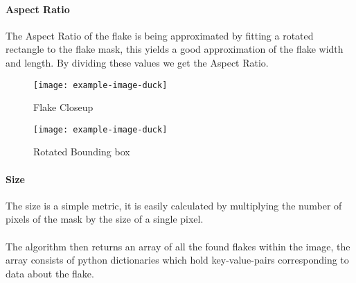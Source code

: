 \paragraph{Aspect Ratio}
The Aspect Ratio of the flake is being approximated by fitting a rotated rectangle to the flake mask, this yields a good approximation of the flake width and length. By dividing these values we get the Aspect Ratio.
\begin{figure}[h!]
\centering
\begin{minipage}{.45\textwidth}
  \centering
  \texttt{[image: example-image-duck]}
  \caption{Flake Closeup}
\end{minipage}
\begin{minipage}{.45\textwidth}

  \centering
  \texttt{[image: example-image-duck]}
    \caption{Rotated Bounding box}
\end{minipage}
\end{figure}

\paragraph{Size}
The size is a simple metric, it is easily calculated by multiplying the number of pixels of the mask by the size of a single pixel.\\
\\
The algorithm then returns an array of all the found flakes within the image, the array consists of python dictionaries which hold key-value-pairs corresponding to data about the flake.